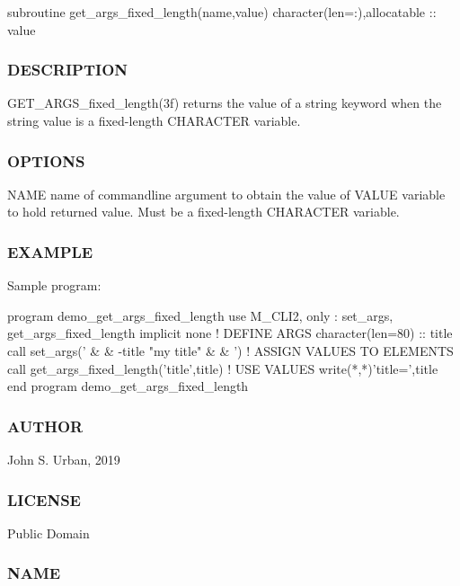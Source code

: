 \begin{DoxyVerb}subroutine get_args_fixed_length(name,value)
 character(len=:),allocatable :: value
\end{DoxyVerb}


\subsubsection*{D\+E\+S\+C\+R\+I\+P\+T\+I\+ON}

\begin{DoxyVerb}GET_ARGS_fixed_length(3f) returns the value of a string
keyword when the string value is a fixed-length CHARACTER
variable.
\end{DoxyVerb}


\subsubsection*{O\+P\+T\+I\+O\+NS}

\begin{DoxyVerb}NAME   name of commandline argument to obtain the value of
VALUE  variable to hold returned value.
       Must be a fixed-length CHARACTER variable.
\end{DoxyVerb}


\subsubsection*{E\+X\+A\+M\+P\+LE}

Sample program\+: \begin{DoxyVerb}program demo_get_args_fixed_length
use M_CLI2,  only : set_args, get_args_fixed_length
implicit none
! DEFINE ARGS
character(len=80)   :: title
call set_args(' &
   & -title "my title" &
   & ')
! ASSIGN VALUES TO ELEMENTS
   call get_args_fixed_length('title',title)
! USE VALUES
   write(*,*)'title=',title
end program demo_get_args_fixed_length
\end{DoxyVerb}


\subsubsection*{A\+U\+T\+H\+OR}

John S. Urban, 2019 \subsubsection*{L\+I\+C\+E\+N\+SE}

Public Domain \subsubsection*{N\+A\+ME}

